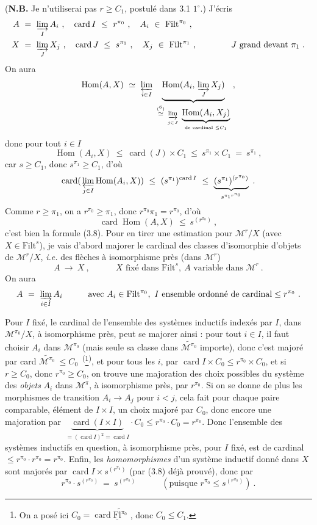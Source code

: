 \documentclass[11pt]{article}
\newcommand{\printedpage}[1]{\marginpar{\footnotesize p.~#1}}
\newcommand{\msp}[1]{\marginpar{\footnotesize [#1]}}
\newcommand{\M}{\mathcal{M}}
\newcommand{\uFl}{\underline{\mathrm{Fl}}}
\newcommand{\Filt}{\mathrm{Filt}}
\newcommand{\card}{\operatorname{card}}
\newcommand{\Hom}{\operatorname{Hom}}
\newcommand{\wavy}[1]{\widetilde{#1}}
\begin{document}
(\textbf{N.B.} Je n'utiliserai pas $r\geq C_1$, postulé dans 3.1 $1^\circ$.) J'écris 
\[
\begin{aligned}
A\ &=\ \varinjlim_I A_i\ ,\quad \card I\ \leq\ r^{\pi_0}\ ,\quad A_i\ \in\ \Filt^{\pi_0}\ ,\\
X\ &=\ \varinjlim_J X_j\ ,\quad \card J\ \leq\ s^{\pi_1}\ ,\quad X_j\ \in\ \Filt^{\pi_1}\ ,\qquad\qquad J\text{ grand devant }\pi_1\ .
\end{aligned}
\]
On aura
\[
\Hom(A,X)\ \simeq\ \varprojlim_{i\in I}\ \underbrace{\Hom(A_i,\,\varinjlim_J X_j)}_{\overset{(\text{\footnotemark[6]})}{\simeq}\ \varinjlim\limits_{j\in J}\ \underbrace{\Hom(A_i,X_j)}_{\text{de cardinal }\leq C_1}}\ ,
\]
\footnotetext[6]{car les $A\in\Filt^{\pi_0}$ sont $\pi_1$-accessibles.}
donc pour tout $i\in I$
\[
\Hom(A_i,X)\ \leq\ \card(J)\times C_1\ \leq\ s^{\pi_1}\times C_1\ =\ s^{\pi_1}\ ,
\]
car $s\geq C_1$, donc $s^{\pi_1}\geq C_1$, d'où
\[
\card(\,\varprojlim_{j\in I}\Hom(A_i,X))\ \leq\ (s^{\pi_1})^{\card I}\ \leq\ \underbrace{(s^{\pi_1})^{(r^{\pi_0})}}_{s^{\pi_1 r^{\pi_0}}}\ . %
\]
Comme $r\geq\pi_1$, on a $r^{\pi_0}\geq\pi_1$, donc $r^{\pi_0}\pi_1=r^{\pi_0}$, d'où
\[
\card\Hom(A,X)\ \leq\ s^{(r^{\pi_0})}\ ,
\]
c'est bien la formule (3.8). Pour en tirer une estimation pour $\M^r/X$ (avec $X\in\Filt^s$), \msp{page 21} je vais d'abord majorer le cardinal des classes d'isomorphie d'objets de $\M^r/X$, \textit{i.e.} des flèches à isomorphisme près (dans $\M^r$)
\[
A\ \longrightarrow\ X\ ,\qquad\quad X\text{ fixé dans }\Filt^s,\ A\text{ variable dans }\M^r\ .
\]
On aura
\[
A\ =\ \varinjlim_{i\in I} A_i\qquad\quad\text{avec } A_i\in\Filt^{\pi_0},\ I\text{ ensemble ordonné de cardinal}\leq r^{\pi_0}\ .
\]

\printedpage{15}
Pour $I$ fixé, le cardinal de l'ensemble des systèmes inductifs indexés par $I$, dans $\M^{\pi_0}/X$, à isomorphisme près, peut se majorer ainsi : pour tout $i\in I$, il faut choisir $A_i$ dans $\M^{\pi_0}$ (mais seule sa classe dans $\wavy{\M^{\pi_0}}$ importe), donc c'est majoré par card $\wavy{\M^{\pi_0}}\ \leq C_0$~\textsuperscript{(}\footnote[7]{On a posé ici $C_0=\card\wavy{\uFl^{\pi_0}}$ , donc $C_0\leq C_1$.}\textsuperscript{)}, et pour tous les $i$, par $\card I\times C_0\leq r^{\pi_0}\times C_0$, et si $r\geq C_0$, donc $r^{\pi_0}\geq C_0$, on trouve une majoration des choix possibles du système des \textit{objets} $A_i$ dans $\M^\pi$, à isomorphisme près, par $r^{\pi_0}$. Si on se donne de plus les morphismes de transition $A_i\longrightarrow A_j$ pour $i<j$, cela fait pour chaque paire comparable, élément de $I\times I$, un choix majoré par $C_0$, donc encore une majoration par $\ \underbrace{\card(I\times I)}_{=(\card I)^2=\card I}\cdot C_0\leq r^{\pi_0}\cdot C_0=r^{\pi_0}$. Donc l'ensemble des systèmes inductifs en question, à isomorphisme près, pour $I$ fixé, est de cardinal $\leq r^{\pi_0}\cdot r^{\pi_0}=r^{\pi_0}$. Enfin, les \textit{homomorphismes} d'un système inductif donné dans $X$ sont majorés par $\card I\times s^{(r^{\pi_0})}$ (par (3.8) déjà prouvé), donc par
\[
r^{\pi_0}\cdot s^{(r^{\pi_0})}\ =\ s^{(r^{\pi_0})}\qquad\quad(\text{puisque } r^{\pi_0}\leq s^{(r^{\pi_0})})\ .
\]
\end{document}
